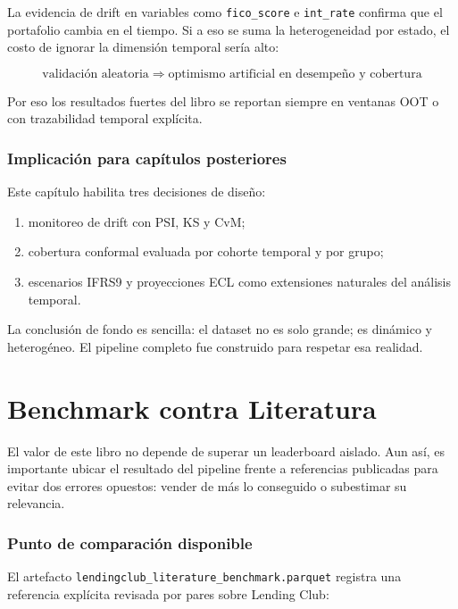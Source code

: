 \documentclass[
  spanish,
  11pt,
  letterpaper,
]{scrbook}
\providecommand{\tightlist}{%
  \setlength{\itemsep}{0pt}\setlength{\parskip}{0pt}}
\theoremstyle{plain}
\theoremstyle{remark}
\begin{document}
La evidencia de drift en variables como \texttt{fico\_score} e
\texttt{int\_rate} confirma que el portafolio cambia en el tiempo. Si a
eso se suma la heterogeneidad por estado, el costo de ignorar la
dimensión temporal sería alto:

\[
\text{validación aleatoria} \;\Rightarrow\; \text{optimismo artificial en desempeño y cobertura}
\]

Por eso los resultados fuertes del libro se reportan siempre en ventanas
OOT o con trazabilidad temporal explícita.

\subsection{Implicación para capítulos
posteriores}\label{implicaciuxf3n-para-capuxedtulos-posteriores}

Este capítulo habilita tres decisiones de diseño:

\begin{enumerate}
\def\labelenumi{\arabic{enumi}.}
\tightlist
\item
  monitoreo de drift con PSI, KS y CvM;
\item
  cobertura conformal evaluada por cohorte temporal y por grupo;
\item
  escenarios IFRS9 y proyecciones ECL como extensiones naturales del
  análisis temporal.
\end{enumerate}

La conclusión de fondo es sencilla: el dataset no es solo grande; es
dinámico y heterogéneo. El pipeline completo fue construido para
respetar esa realidad.

\chapter{Benchmark contra Literatura}\label{sec-literature-benchmark}

El valor de este libro no depende de superar un leaderboard aislado. Aun
así, es importante ubicar el resultado del pipeline frente a referencias
publicadas para evitar dos errores opuestos: vender de más lo conseguido
o subestimar su relevancia.

\subsection{Punto de comparación
disponible}\label{punto-de-comparaciuxf3n-disponible}

El artefacto \texttt{lendingclub\_literature\_benchmark.parquet}
registra una referencia explícita revisada por pares sobre Lending Club:
\end{document}
